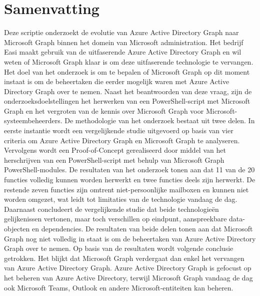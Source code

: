 
%
%
%
%
\chapter*{Samenvatting}
Deze scriptie onderzoekt de evolutie van Azure Active Directory Graph naar Microsoft Graph binnen het domein van Microsoft administration. Het bedrijf Easi maakt gebruik van de uitfaserende Azure Active Directory Graph en wil weten of Microsoft Graph klaar is om deze uitfaserende technologie te vervangen. Het doel van het onderzoek is om te bepalen of Microsoft Graph op dit moment instaat is om de beheertaken die eerder mogelijk waren met Azure Active Directory Graph over te nemen. Naast het beantwoorden van deze vraag, zijn de onderzoeksdoelstellingen het herwerken van een PowerShell-script met Microsoft Graph en het vergroten van de kennis over Microsoft Graph voor Microsoft-systeembeheerders. De methodologie van het onderzoek bestaat uit twee delen. In eerste instantie wordt een vergelijkende studie uitgevoerd op basis van vier criteria om Azure Active Directory Graph en Microsoft Graph te analyseren. Vervolgens wordt een Proof-of-Concept gerealiseerd door middel van het herschrijven van een PowerShell-script met behulp van Microsoft Graph PowerShell-modules. De resultaten van het onderzoek tonen aan dat 11 van de 20 functies volledig kunnen worden herwerkt en twee functies deels zijn herwerkt. De restende zeven functies zijn omtrent niet-persoonlijke mailboxen en kunnen niet worden omgezet, wat leidt tot limitaties van de technologie vandaag de dag. Daarnaast concludeert de vergelijkende studie dat beide technologieën gelijkenissen vertonen, maar toch verschillen op eindpunt, aanspreekbare data-objecten en dependencies. De resultaten van beide delen tonen aan dat Microsoft Graph nog niet volledig in staat is om de beheertaken van Azure Active Directory Graph over te nemen. Op basis van de resultaten wordt volgende conclusie getrokken. Het blijkt dat Microsoft Graph verdergaat dan enkel het vervangen van Azure Active Directory Graph. Azure Active Directory Graph is gefocust op het beheren van Azure Active Directory, terwijl Microsoft Graph vandaag de dag ook Microsoft Teams, Outlook en andere Microsoft-entiteiten kan beheren. 


